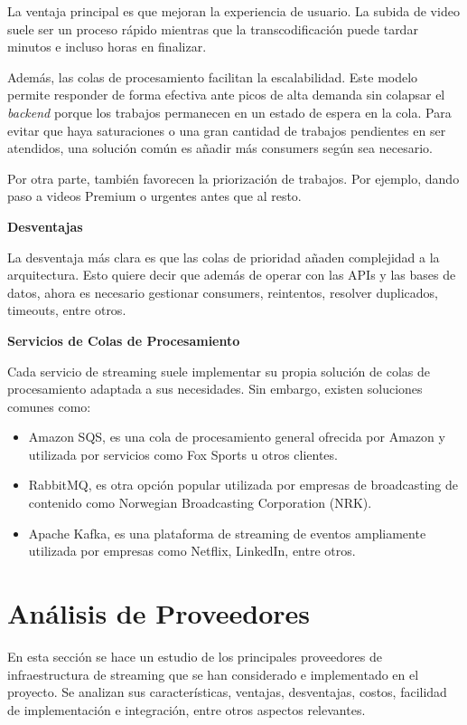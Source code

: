 La ventaja principal es que mejoran la experiencia de usuario. La subida de video suele ser un proceso rápido mientras que la transcodificación puede tardar minutos e incluso horas en finalizar. 

Además, las colas de procesamiento facilitan la escalabilidad. Este modelo permite responder de forma efectiva ante picos de alta demanda sin colapsar el \textit{backend} porque los trabajos permanecen en un estado de espera en la cola. Para evitar que haya saturaciones o una gran cantidad de trabajos pendientes en ser atendidos, una solución común es añadir más consumers según sea necesario. 

Por otra parte, también favorecen la priorización de trabajos. Por ejemplo, dando paso a videos Premium o urgentes antes que al resto.

\textbf{Desventajas}

La desventaja más clara es que las colas de prioridad añaden complejidad a la arquitectura. Esto quiere decir que además de operar con las APIs y las bases de datos, ahora es necesario gestionar consumers, reintentos, resolver duplicados, timeouts, entre otros. 

\textbf{Servicios de Colas de Procesamiento}

Cada servicio de streaming suele implementar su propia solución de colas de procesamiento adaptada a sus necesidades. Sin embargo, existen soluciones comunes como:

\begin{itemize}
    \item Amazon SQS, es una cola de procesamiento general ofrecida por Amazon y utilizada por servicios como Fox Sports u otros clientes.
    \item  RabbitMQ, es otra opción popular utilizada por empresas de broadcasting de contenido como Norwegian Broadcasting Corporation (NRK). 
    \item Apache Kafka, es una plataforma de  streaming de eventos ampliamente utilizada por empresas como Netflix, LinkedIn, entre otros. 
\end{itemize}


\section{Análisis de Proveedores}
\label{2.2}

En esta sección se hace un estudio de los principales proveedores de infraestructura de streaming que se han considerado e implementado en el proyecto. Se analizan sus características, ventajas, desventajas, costos, facilidad de implementación e integración, entre otros aspectos relevantes. 

